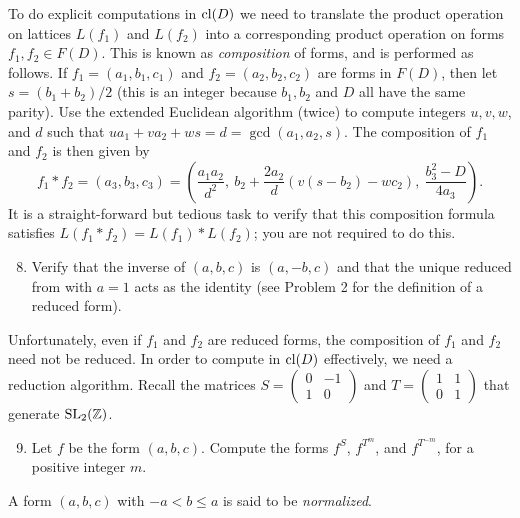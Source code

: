 \documentclass[11pt]{article}
\newcommand{\Z}{\mathbb{Z}}
\newcommand{\SL}{{\rm SL}}
\newcommand{\cl}{{\rm cl}}
\theoremstyle{definition}
\begin{document}
To do explicit computations in $\cl(D)$ we need to translate the product operation on lattices $L(f_1)$ and $L(f_2)$ into a corresponding product operation on forms $f_1,f_2\in F(D)$.  This is known as \emph{composition} of forms, and is performed as follows.
If $f_1=(a_1,b_1,c_1)$ and $f_2=(a_2,b_2,c_2)$ are forms in $F(D)$, then let $s=(b_1+b_2)/2$ (this is an integer because $b_1, b_2$ and $D$ all have the same parity).
Use the extended Euclidean algorithm (twice) to compute integers $u,v,w$, and $d$ such that $ua_1+va_2+ws=d=\gcd(a_1,a_2,s)$.  The composition of $f_1$ and $f_2$ is then given by
\[
f_1*f_2 = (a_3,b_3,c_3) = \left(\frac{a_1a_2}{d^2},\ b_2+\frac{2a_2}{d}(v(s-b_2)-wc_2),\ \frac{b_3^2-D}{4a_3}\right).
\]
It is a straight-forward but tedious task to verify that this composition formula satisfies $L(f_1*f_2)=L(f_1)*L(f_2)$; you are not required to do this.
\begin{enumerate}[{\bf(a)}]
\setcounter{enumi}{7}
\item
Verify that the inverse of $(a,b,c)$ is $(a,-b,c)$ and that the unique reduced from with $a=1$ acts as the identity (see Problem 2 for the definition of a reduced form).
\end{enumerate}
Unfortunately, even if $f_1$ and $f_2$ are reduced forms, the composition of $f_1$ and $f_2$ need not be reduced.
In order to compute in $\cl(D)$ effectively, we need a reduction algorithm.
Recall the matrices $S=\left(\begin{smallmatrix}0&-1\\1&0\end{smallmatrix}\right)$ and $T=\left(\begin{smallmatrix}1&1\\0&1\end{smallmatrix}\right)$ that generate $\SL_2(\Z)$.
\begin{enumerate}[{\bf (a)}]
\setcounter{enumi}{8}
\item Let $f$ be the form $(a,b,c)$.  Compute the forms $f^S$, $f^{T^m}$, and $f^{T^{-m}}$, for a positive integer $m$.
\end{enumerate}
A form $(a,b,c)$ with $-a<b\le a$ is said to be \emph{normalized}.
\end{document}
